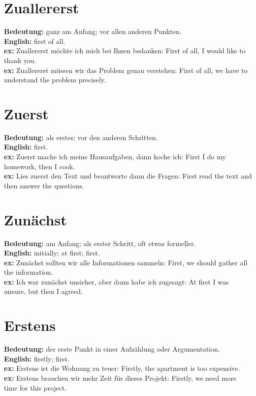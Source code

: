 \documentclass[a4paper]{article}
\title{}
\date{}
\begin{document}
    \maketitle
    
    
    \section{Zuallererst}
        \textbf{Bedeutung:} ganz am Anfang; vor allen anderen Punkten.\\
        \textbf{English:} first of all.\\
        \textbf{ex:} Zuallererst möchte ich mich bei Ihnen bedanken: First of all, I would like to thank you.\\
        \textbf{ex:} Zuallererst müssen wir das Problem genau verstehen: First of all, we have to understand the problem precisely.
    
    
    \section{Zuerst}
        \textbf{Bedeutung:} als erstes; vor den anderen Schritten.\\
        \textbf{English:} first.\\
        \textbf{ex:} Zuerst mache ich meine Hausaufgaben, dann koche ich: First I do my homework, then I cook.\\
        \textbf{ex:} Lies zuerst den Text und beantworte dann die Fragen: First read the text and then answer the questions.
    
    
    \section{Zunächst}
        \textbf{Bedeutung:} am Anfang; als erster Schritt, oft etwas formeller.\\
        \textbf{English:} initially; at first; first.\\
        \textbf{ex:} Zunächst sollten wir alle Informationen sammeln: First, we should gather all the information.\\
        \textbf{ex:} Ich war zunächst unsicher, aber dann habe ich zugesagt: At first I was unsure, but then I agreed.
    
    
    \section{Erstens}
        \textbf{Bedeutung:} der erste Punkt in einer Aufzählung oder Argumentation.\\
        \textbf{English:} firstly; first.\\
        \textbf{ex:} Erstens ist die Wohnung zu teuer: Firstly, the apartment is too expensive.\\
        \textbf{ex:} Erstens brauchen wir mehr Zeit für dieses Projekt: Firstly, we need more time for this project.
    
\end{document}
